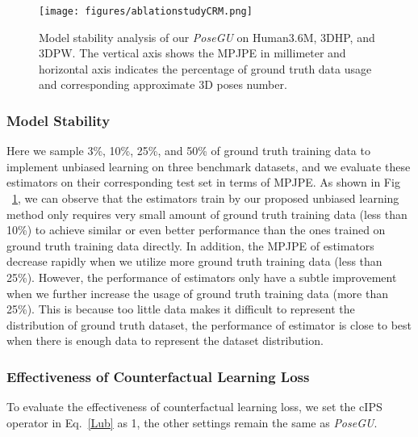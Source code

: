 \documentclass[runningheads]{llncs}
\begin{document}
\begin{figure}[h]
    \centering
    \texttt{[image: figures/ablationstudyCRM.png]}
    \caption{Model stability analysis of our \textit{PoseGU} on Human3.6M, 3DHP, and 3DPW. The vertical axis shows the MPJPE in millimeter and horizontal axis indicates the percentage of ground truth data usage and corresponding approximate 3D poses number.}
    \label{fig:ablationstudyCRM}
\end{figure}

\subsubsection{Model Stability} 
Here we sample 3\%, 10\%, 25\%, and 50\% of ground truth training data to implement unbiased learning on three benchmark datasets, and we evaluate these estimators on their corresponding test set in terms of MPJPE. 
As shown in Fig ~\ref{fig:ablationstudyCRM}, we can observe that the estimators train by our proposed unbiased learning method only requires very small amount of ground truth training data (less than 10\%) to achieve similar or even better performance than the ones trained on ground truth training data directly. In addition, the MPJPE of estimators decrease rapidly when we utilize more ground truth training data (less than 25\%). 
However, the performance of estimators only have a subtle improvement when we further increase the usage of ground truth training data (more than 25\%). This is because too little data makes it difficult to represent the distribution of ground truth dataset, the performance of estimator is close to best when there is enough data to represent the dataset distribution. 

\subsubsection{Effectiveness of Counterfactual Learning Loss} 
To evaluate the effectiveness of counterfactual learning loss, we set the cIPS operator in Eq.~\ref{Lub} as 1, the other settings remain the same as \textit{PoseGU}. 
\end{document}
